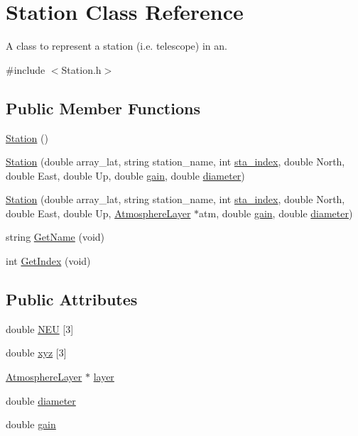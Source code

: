 \hypertarget{classStation}{
\section{Station Class Reference}
\label{classStation}
}


A class to represent a station (i.e. telescope) in an.  




{\ttfamily \#include $<$Station.h$>$}

\subsection*{Public Member Functions}
\begin{DoxyCompactItemize}
\item 
\hyperlink{classStation_a73d335726aad1d844d81cda6d9fd74e6}{Station} ()
\item 
\hyperlink{classStation_a47edc3b9cf60324e4b1146c94a2cbaf5}{Station} (double array\_\-lat, string station\_\-name, int \hyperlink{classStation_a1d576c7627ce27b72d78cbfe26c29d60}{sta\_\-index}, double North, double East, double Up, double \hyperlink{classStation_a132660da885c826d92750aee2e469cfe}{gain}, double \hyperlink{classStation_aa7b65ca1b24be6b9b071097d5581054c}{diameter})
\item 
\hyperlink{classStation_a23e85488389f1f084e5d149564e72e17}{Station} (double array\_\-lat, string station\_\-name, int \hyperlink{classStation_a1d576c7627ce27b72d78cbfe26c29d60}{sta\_\-index}, double North, double East, double Up, \hyperlink{classAtmosphereLayer}{AtmosphereLayer} $\ast$atm, double \hyperlink{classStation_a132660da885c826d92750aee2e469cfe}{gain}, double \hyperlink{classStation_aa7b65ca1b24be6b9b071097d5581054c}{diameter})
\item 
string \hyperlink{classStation_aad118a81a8498e1196c85b7a16e3be91}{GetName} (void)
\item 
int \hyperlink{classStation_afd50ce755b324127b1f1e8929bff31aa}{GetIndex} (void)
\end{DoxyCompactItemize}
\subsection*{Public Attributes}
\begin{DoxyCompactItemize}
\item 
double \hyperlink{classStation_a49b5c4024685c59892989eb78167c0a2}{NEU} \mbox{[}3\mbox{]}
\item 
double \hyperlink{classStation_af5b031756ab9e16e3f35bfd9ca0f0d70}{xyz} \mbox{[}3\mbox{]}
\item 
\hyperlink{classAtmosphereLayer}{AtmosphereLayer} $\ast$ \hyperlink{classStation_aad67aa8d99ed867ff834ef644ef4f511}{layer}
\item 
double \hyperlink{classStation_aa7b65ca1b24be6b9b071097d5581054c}{diameter}
\item 
double \hyperlink{classStation_a132660da885c826d92750aee2e469cfe}{gain}
\end{DoxyCompactItemize}
